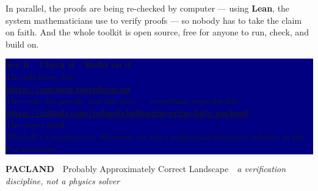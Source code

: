 \documentclass[11pt]{article}
\begin{document}
In parallel, the proofs are being re-checked by computer --- using \textbf{Lean}, the system
mathematicians use to verify proofs --- so nobody has to take the claim on faith. And the
whole toolkit is open source, free for anyone to run, check, and build on.

\vspace{1.0em}
\noindent
\colorbox{navy}{%
  \parbox{\dimexpr\linewidth-2\fboxsep\relax}{%
    \vspace{0.3em}
    \begin{center}
      {\color{accent}\large\bfseries See it \,\textbullet\, Check it \,\textbullet\, Build on it}\\[0.45em]
      {\color{white}\small The full story, live:}\\[0.15em]
      {\color{white}\large\bfseries\url{https://pacland.morpheus.nz}}\\[0.5em]
      {\color{white}\small The code, the proofs, and the data --- everything reproducible:}\\[0.15em]
      {\color{white}\large\bfseries\url{https://github.com/robmitchellengineering-hub/pacland}}\\[0.5em]
      {\color{white}\small The paper itself:}\\[0.15em]
      {\color{white}\normalsize\emph{Mitchell's Completeness Theorem: no exact polynomial invariant
      selector in the flux landscape}}
    \end{center}
    \vspace{0.3em}
  }%
}

\vspace{0.7em}
\begin{center}
  {\footnotesize\color{navy}\textbf{PACLAND} \,\textbullet\, Probably Approximately Correct
  Landscape \,\textbullet\, \emph{a verification discipline, not a physics solver}}
\end{center}
\end{document}
